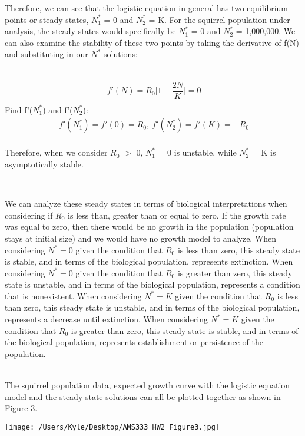 \documentclass[12pt]{article}
\begin{document}
Therefore, we can see that the logistic equation in general has two equilibrium points or steady states, $N^*_1$ = 0 and $N^*_2$ = K. For the squirrel population under analysis, the steady states would specifically be $N^*_1$ = 0 and $N^*_2$ = 1,000,000. We can also examine the stability of these two points by taking the derivative of f(N) and substituting in our $N^*$ solutions:\\\

\begin{gather*}\
f'(N) = R_0\Big[1 - \dfrac{2N}{K}\Big] = 0 \\
\end{gather*}
Find f'($N^*_1$) and f'($N^*_2$):
\begin{gather*}\
 f'(N^*_1) = f'(0) = R_0, \ f'(N^*_2) = f'(K) = -R_0 \\
\end{gather*}
\begin{center}
Therefore, when we consider $R_0$ $>$ 0, $N^*_1$ = 0 is unstable, while $N^*_2$ = K is asymptotically stable.
\end{center}\

We can analyze these steady states in terms of biological interpretations when considering if $R_0$ is less than, greater than or equal to zero. If the growth rate was equal to zero, then there would be no growth in the population (population stays at initial size) and we would have no growth model to analyze. When considering $N^{*}=0$ given the condition that $R_0$ is less than zero, this steady state is stable, and in terms of the biological population, represents extinction. When considering $N^{*}=0$ given the condition that $R_0$ is greater than zero, this steady state is unstable, and in terms of the biological population, represents a condition that is nonexistent. When considering $N^{*}=K$ given the condition that $R_0$ is less than zero, this steady state is unstable, and in terms of the biological population, represents a decrease until extinction. When considering $N^{*}=K$ given the condition that $R_0$ is greater than zero, this steady state is stable, and in terms of the biological population, represents establishment or persistence of the population.\\\ 

The squirrel population data, expected growth curve with the logistic equation model and the steady-state solutions can all be plotted together as shown in Figure 3. \\

\begin{center}
   \texttt{[image: /Users/Kyle/Desktop/AMS333\_HW2\_Figure3.jpg]}
\end{center}\
\end{document}
